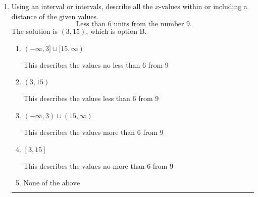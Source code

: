 \documentclass{extbook}[14pt]
\newcommand{\litem}[1]{\item #1

\rule{\textwidth}{0.4pt}}
\begin{document}
\begin{enumerate}
{\begin{enumerate}[label=\Alph*.]
$(-\infty, -3.20] \cup (-12.50, \infty)$, which corresponds to displaying the and-inequality as an or-inequality and getting negatives of the actual endpoints.
\item \( (-\infty, a) \cup [b, \infty), \text{ where } a \in [-5.25, -0.75] \text{ and } b \in [-13.5, -11.25] \)

$(-\infty, -3.20) \cup [-12.50, \infty)$, which corresponds to displaying the and-inequality as an or-inequality AND flipping the inequality AND getting negatives of the actual endpoints.
\item \( (a, b], \text{ where } a \in [-7.5, -2.25] \text{ and } b \in [-14.25, -10.5] \)

$(-3.20, -12.50]$, which corresponds to flipping the inequality and getting negatives of the actual endpoints.
\item \( [a, b), \text{ where } a \in [-4.5, -1.5] \text{ and } b \in [-16.5, -9.75] \)

$[-3.20, -12.50)$, which is the correct interval but negatives of the actual endpoints.
\item \( \text{None of the above.} \)

* This is correct as the answer should be $[3.20, 12.50)$.
\end{enumerate}

\textbf{General Comment:} To solve, you will need to break up the compound inequality into two inequalities. Be sure to keep track of the inequality! It may be best to draw a number line and graph your solution.
}
\litem{
Using an interval or intervals, describe all the $x$-values within or including a distance of the given values.
\[ \text{ Less than } 6 \text{ units from the number } 9. \]The solution is \( (3, 15) \), which is option B.\begin{enumerate}[label=\Alph*.]
\item \( (-\infty, 3] \cup [15, \infty) \)

This describes the values no less than 6 from 9
\item \( (3, 15) \)

This describes the values less than 6 from 9
\item \( (-\infty, 3) \cup (15, \infty) \)

This describes the values more than 6 from 9
\item \( [3, 15] \)

This describes the values no more than 6 from 9
\item \( \text{None of the above} \)


\end{enumerate}}
\end{enumerate}
\end{document}
